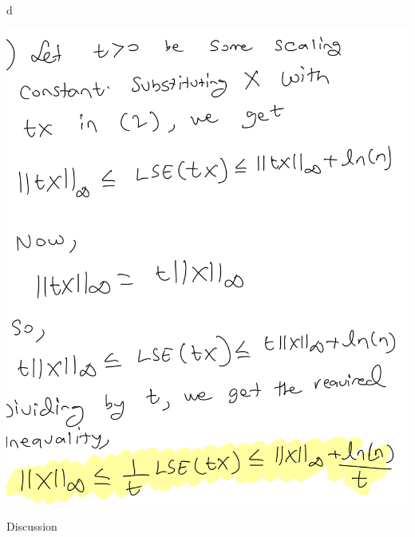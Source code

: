 \documentclass{article}
\renewcommand{\bf}[1]{\textbf{{#1}}}
\newcommand{\ul}[1]{\underline{{#1}}}
\newcommand{\tbu}{\bf{\ul{}}}
\begin{document}
\begin{minipage}{2.6in}
\tbu{d}

\includegraphics[scale=0.22]{mr6d.png}
\end{minipage}

\tbu{Discussion}
\end{document}
